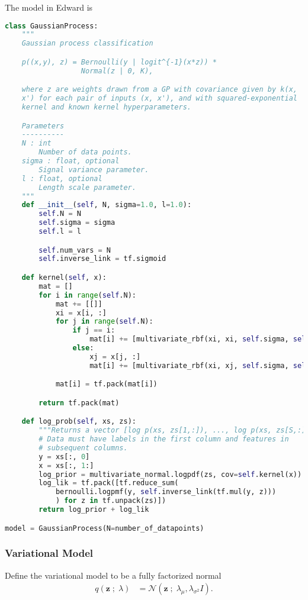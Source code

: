 The model in Edward is
\begin{lstlisting}[language=Python]
class GaussianProcess:
    """
    Gaussian process classification

    p((x,y), z) = Bernoulli(y | logit^{-1}(x*z)) *
                  Normal(z | 0, K),

    where z are weights drawn from a GP with covariance given by k(x,
    x') for each pair of inputs (x, x'), and with squared-exponential
    kernel and known kernel hyperparameters.

    Parameters
    ----------
    N : int
        Number of data points.
    sigma : float, optional
        Signal variance parameter.
    l : float, optional
        Length scale parameter.
    """
    def __init__(self, N, sigma=1.0, l=1.0):
        self.N = N
        self.sigma = sigma
        self.l = l

        self.num_vars = N
        self.inverse_link = tf.sigmoid

    def kernel(self, x):
        mat = []
        for i in range(self.N):
            mat += [[]]
            xi = x[i, :]
            for j in range(self.N):
                if j == i:
                    mat[i] += [multivariate_rbf(xi, xi, self.sigma, self.l)]
                else:
                    xj = x[j, :]
                    mat[i] += [multivariate_rbf(xi, xj, self.sigma, self.l)]

            mat[i] = tf.pack(mat[i])

        return tf.pack(mat)

    def log_prob(self, xs, zs):
        """Returns a vector [log p(xs, zs[1,:]), ..., log p(xs, zs[S,:])]."""
        # Data must have labels in the first column and features in
        # subsequent columns.
        y = xs[:, 0]
        x = xs[:, 1:]
        log_prior = multivariate_normal.logpdf(zs, cov=self.kernel(x))
        log_lik = tf.pack([tf.reduce_sum(
            bernoulli.logpmf(y, self.inverse_link(tf.mul(y, z)))
            ) for z in tf.unpack(zs)])
        return log_prior + log_lik

model = GaussianProcess(N=number_of_datapoints)
\end{lstlisting}


\subsubsection{Variational Model}
Define the variational model to be a fully factorized normal
\begin{align*}
  q(\mathbf{z} \;;\; \lambda)
  &=
  \mathcal{N}(\mathbf{z} \;;\; \lambda_\mu, \lambda_{\sigma^2} I).
\end{align*}

